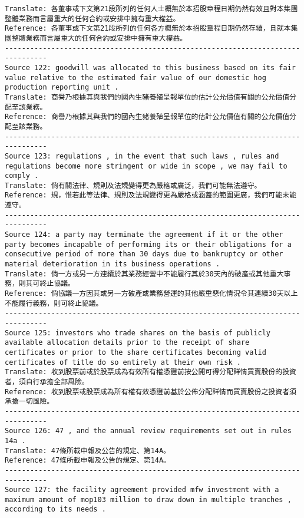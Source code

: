 \documentclass[11pt]{article}
\begin{document}
\begin{Verbatim}[commandchars=\\\{\}]
Translate: 各董事或下文第21段所列的任何人士概無於本招股章程日期仍然有效且對本集團整體業務而言屬重大的任何合約或安排中擁有重大權益。
Reference: 各董事或下文第21段所列的任何各方概無於本招股章程日期仍然存續，且就本集團整體業務而言屬重大的任何合約或安排中擁有重大權益。
--------------------------------------------------------------------------------
Source 122: goodwill was allocated to this business based on its fair value relative to the estimated fair value of our domestic hog production reporting unit .
Translate: 商譽乃根據其與我們的國內生豬養殖呈報單位的估計公允價值有關的公允價值分配至該業務。
Reference: 商譽乃根據其與我們的國內生豬養殖呈報單位的估計公允價值有關的公允價值分配至該業務。
--------------------------------------------------------------------------------
Source 123: regulations , in the event that such laws , rules and regulations become more stringent or wide in scope , we may fail to comply .
Translate: 倘有關法律、規則及法規變得更為嚴格或廣泛，我們可能無法遵守。
Reference: 規，惟若此等法律、規則及法規變得更為嚴格或涵蓋的範圍更廣，我們可能未能遵守。
--------------------------------------------------------------------------------
Source 124: a party may terminate the agreement if it or the other party becomes incapable of performing its or their obligations for a consecutive period of more than 30 days due to bankruptcy or other material deterioration in its business operations .
Translate: 倘一方或另一方連續於其業務經營中不能履行其於30天內的破產或其他重大事務，則其可終止協議。
Reference: 倘協議一方因其或另一方破產或業務營運的其他嚴重惡化情況令其連續30天以上不能履行義務，則可終止協議。
--------------------------------------------------------------------------------
Source 125: investors who trade shares on the basis of publicly available allocation details prior to the receipt of share certificates or prior to the share certificates becoming valid certificates of title do so entirely at their own risk .
Translate: 收到股票前或於股票成為有效所有權憑證前按公開可得分配詳情買賣股份的投資者，須自行承擔全部風險。
Reference: 收到股票或股票成為所有權有效憑證前基於公佈分配詳情而買賣股份之投資者須承擔一切風險。
--------------------------------------------------------------------------------
Source 126: 47 , and the annual review requirements set out in rules 14a .
Translate: 47條所載申報及公告的規定、第14A。
Reference: 47條所載申報及公告的規定、第14A。
--------------------------------------------------------------------------------
Source 127: the facility agreement provided mfw investment with a maximum amount of mop103 million to draw down in multiple tranches , according to its needs .

\end{Verbatim}
\end{document}
